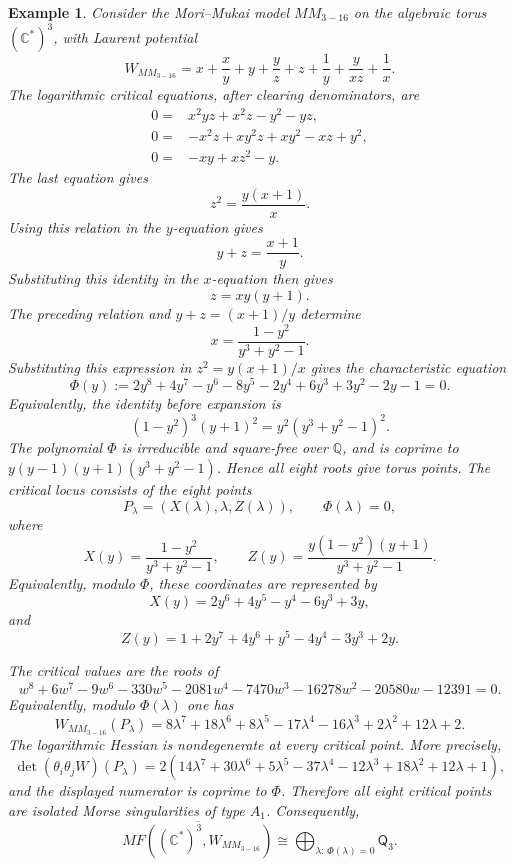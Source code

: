 \documentclass[11pt]{amsart}
\newtheorem{example}{Example}[section]
\newcommand{\MorseCat}[1]{\mathsf{Q}_{#1}}
\begin{document}
\begin{example}
Consider the Mori--Mukai model $MM_{3-16}$ on the algebraic torus
$(\mathbb{C}^*)^3$, with Laurent potential
\[
W_{MM_{3-16}}=x+\frac{x}{y}+y+\frac{y}{z}+z+\frac{1}{y}
+\frac{y}{xz}+\frac{1}{x}.
\]
The logarithmic critical equations, after clearing denominators, are
\begin{align*}
0={}&x^2yz+x^2z-y^2-yz, \\
0={}&-x^2z+xy^2z+xy^2-xz+y^2, \\
0={}&-xy+xz^2-y.
\end{align*}
The last equation gives
\[
z^2=\frac{y(x+1)}{x}.
\]
Using this relation in the $y$-equation gives
\[
y+z=\frac{x+1}{y}.
\]
Substituting this identity in the $x$-equation then gives
\[
z=xy(y+1).
\]
The preceding relation and $y+z=(x+1)/y$ determine
\[
x=\frac{1-y^2}{y^3+y^2-1}.
\]
Substituting this expression in $z^2=y(x+1)/x$ gives the characteristic
equation
\[
\Phi(y):=2y^8+4y^7-y^6-8y^5-2y^4+6y^3+3y^2-2y-1=0.
\]
Equivalently, the identity before expansion is
\[
(1-y^2)^3(y+1)^2=y^2(y^3+y^2-1)^2.
\]
The polynomial $\Phi$ is irreducible and square-free over $\mathbb{Q}$, and
is coprime to $y(y-1)(y+1)(y^3+y^2-1)$. Hence all eight roots give torus
points. The critical locus consists of the eight points
\[
P_\lambda=(X(\lambda),\lambda,Z(\lambda)),
\qquad
\Phi(\lambda)=0,
\]
where
\[
X(y)=\frac{1-y^2}{y^3+y^2-1},
\qquad
Z(y)=\frac{y(1-y^2)(y+1)}{y^3+y^2-1}.
\]
Equivalently, modulo $\Phi$, these coordinates are represented by
\[
X(y)=2y^6+4y^5-y^4-6y^3+3y,
\]
and
\[
Z(y)=1+2y^7+4y^6+y^5-4y^4-3y^3+2y.
\]

The critical values are the roots of
\[
w^8+6w^7-9w^6-330w^5-2081w^4-7470w^3
-16278w^2-20580w-12391=0.
\]
Equivalently, modulo $\Phi(\lambda)$ one has
\[
W_{MM_{3-16}}(P_\lambda)=
8\lambda^7+18\lambda^6+8\lambda^5-17\lambda^4
-16\lambda^3+2\lambda^2+12\lambda+2.
\]
The logarithmic Hessian is nondegenerate at every critical point. More
precisely,
\[
\det(\theta_i\theta_jW)(P_\lambda)
=2(14\lambda^7+30\lambda^6+5\lambda^5-37\lambda^4
-12\lambda^3+18\lambda^2+12\lambda+1),
\]
and the displayed numerator is coprime to $\Phi$. Therefore all eight critical
points are isolated Morse singularities of type $A_1$. Consequently,
\[
\overline{MF((\mathbb{C}^*)^3,W_{MM_{3-16}})}
\cong \bigoplus_{\lambda:\,\Phi(\lambda)=0}\MorseCat{3}.
\]
\end{example}
\end{document}
